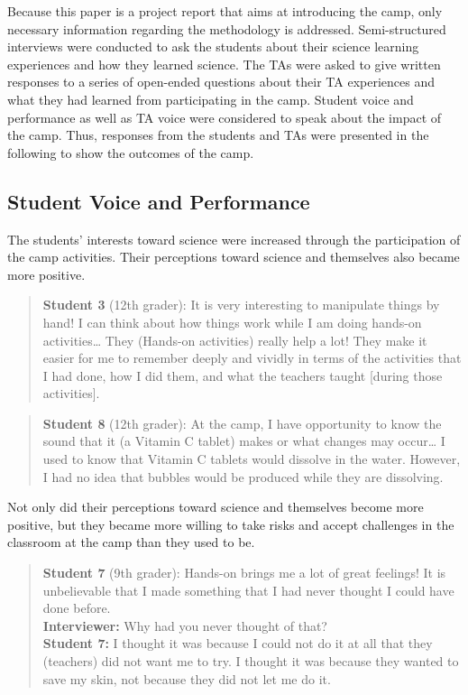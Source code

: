 \documentclass[11.5pt]{sig-alternate} %
\begin{document}
\begin{large}
Because this paper is a project report that aims at introducing the camp, only necessary information regarding the methodology is addressed. Semi-structured interviews were conducted to ask the students about their science learning experiences and how they learned science. The TAs were asked to give written responses to a series of open-ended questions about their TA experiences and what they had learned from participating in the camp. Student voice and performance as well as TA voice were considered to speak about the impact of the camp. Thus, responses from the students and TAs were presented in the following to show the outcomes of the camp.

\subsection*{Student Voice and Performance}

The students’ interests toward science were increased through the participation of the camp activities. Their perceptions toward science and themselves also became more positive.

\begin{quote}
\textbf{Student 3} (12th grader): It is very interesting to manipulate things by hand! I can think about how things work while I am doing hands-on activities… They (Hands-on activities) really help a lot! They make it easier for me to remember deeply and vividly in terms of the activities that I had done, how I did them, and what the teachers taught [during those activities].
\end{quote}

\begin{quote}
\textbf{Student 8} (12th grader): At the camp, I have opportunity to know the sound that it (a Vitamin C tablet) makes or what changes may occur… I used to know that Vitamin C tablets would dissolve in the water. However, I had no idea that bubbles would be produced while they are dissolving.
\end{quote}

Not only did their perceptions toward science and themselves become more positive, but they became more willing to take risks and accept challenges in the classroom at the camp than they used to be.

\begin{quote}
\textbf{Student 7} (9th grader): Hands-on brings me a lot of great feelings! It is unbelievable that I made something that I had never thought I could have done before. \\
\textbf{Interviewer:} Why had you never thought of that? \\
\textbf{Student 7:} I thought it was because I could not do it at all that they (teachers) did not want me to try. I thought it was because they wanted to save my skin, not because they did not let me do it.
\end{quote}


\end{large}
\end{document}

